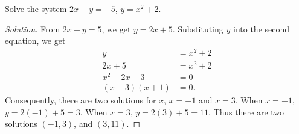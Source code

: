 \documentclass{ximera}
\begin{document}
\begin{example}
	Solve the system $2x - y = -5$, $y = x^2 + 2$.
\end{example}
\begin{proof}[Solution]
From $2x-y = 5$, we get $y = 2x+5$.  Substituting $y$ into the second equation, we get
\begin{align*}
	y &= x^2 + 2\\
	2x+5 &= x^2 + 2\\
	x^2 - 2x - 3 &= 0\\
	(x-3)(x+1) &= 0.
\end{align*}
Consequently, there are two solutions for $x$, $x = -1$ and $x=3$.  When $x = -1$, $y = 2(-1)+5 = 3$.  When $x = 3$, $y = 2(3)+5 = 11$.
Thus there are two solutions $(-1,3)$, and $(3, 11)$.
\end{proof}
\end{document}
